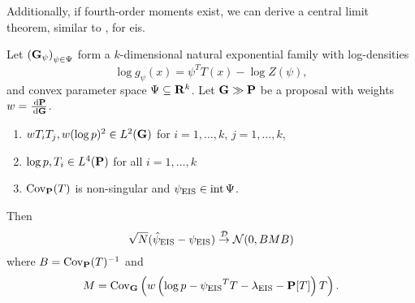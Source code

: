 Additionally, if fourth-order moments exist, we can derive a central limit theorem, similar to , for \acrshort{eis}.

\begin{theorem}
    \label{thm:eis-clt}
    Let $\left( \G_{\psi} \right)_{\psi \in \Psi}$ form a $k$-dimensional natural exponential family with log-densities 
    $$
    \log g_{\psi}(x) = \psi^{T} T(x) - \log Z(\psi),
    $$
    and convex parameter space $\Psi \subseteq \R^{k}$. Let $\G \gg \P$ be a proposal with weights $w = \rnd{\P}{\G}$. 

    \begin{enumerate}
        \item\label{it:secondISmomentsexist}$w T_{i}T_{j}, w (\log p)^{2} \in L^{2}(\G)$ for $i = 1, \dots, k$, $j = 1, \dots, k$,
        \item\label{it:fourthmomentsexist} $\log p, T_i \in L^{4}(\P)$ for all $i = 1, \dots, k$
        \item $\cov_{\P}(T)$ is non-singular and $\peis \in \operatorname{int} \Psi$.
    \end{enumerate}

    Then 
    $$
        \sqrt{N} (\hpeis - \peis) \convD \Normal (0, BMB)
    $$
    where $B = \cov_{\P}(T)^{-1}$ and 
    $$
    M = \cov_{\G} \left( w \left( \log p - \peis^{T}T - \lambda_{\eis} - \P[T] \right)T \right).
    $$
\end{theorem}

